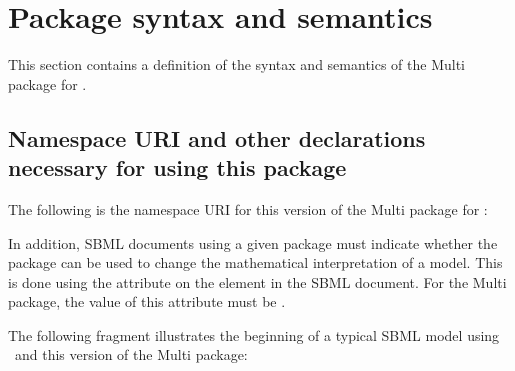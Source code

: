 
\section{Package syntax and semantics}
\label{def:Package_syntax_semantics}

This section contains a definition of the syntax and semantics of the Multi package for \SbmlLevelThreeCore.

\subsection{Namespace URI and other declarations necessary for using this package}
\label{def:Namespace_URI}

The following is the namespace URI for this version of the Multi package for \SbmlLevelThreeCore:
\begin{center}
\end{center}

In addition, SBML documents using a given package must indicate whether the package can be used to change the mathematical interpretation of a model. This is done using the attribute  on the  element in the SBML document. For the Multi package, the value of this attribute must be .

The following fragment illustrates the beginning of a typical SBML model using \SbmlLevelThreeCore\ and this version of the Multi package:


